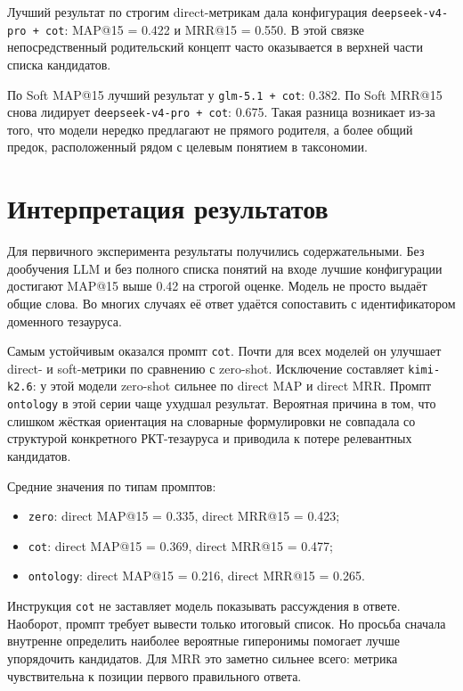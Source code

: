 \documentclass[12pt,a4paper,oneside,openany]{report}
\begin{document}
Лучший результат по строгим direct-метрикам дала конфигурация \texttt{deepseek-v4-pro + cot}: MAP@15 = 0.422 и MRR@15 = 0.550. В этой связке непосредственный родительский концепт часто оказывается в верхней части списка кандидатов.

По Soft MAP@15 лучший результат у \texttt{glm-5.1 + cot}: 0.382. По Soft MRR@15 снова лидирует \texttt{deepseek-v4-pro + cot}: 0.675. Такая разница возникает из-за того, что модели нередко предлагают не прямого родителя, а более общий предок, расположенный рядом с целевым понятием в таксономии.

\section{Интерпретация результатов}

Для первичного эксперимента результаты получились содержательными. Без дообучения LLM и без полного списка понятий на входе лучшие конфигурации достигают MAP@15 выше 0.42 на строгой оценке. Модель не просто выдаёт общие слова. Во многих случаях её ответ удаётся сопоставить с идентификатором доменного тезауруса.

Самым устойчивым оказался промпт \texttt{cot}. Почти для всех моделей он улучшает direct- и soft-метрики по сравнению с zero-shot. Исключение составляет \texttt{kimi-k2.6}: у этой модели zero-shot сильнее по direct MAP и direct MRR. Промпт \texttt{ontology} в этой серии чаще ухудшал результат. Вероятная причина в том, что слишком жёсткая ориентация на словарные формулировки не совпадала со структурой конкретного РКТ-тезауруса и приводила к потере релевантных кандидатов.

Средние значения по типам промптов:
\begin{itemize}
  \item \texttt{zero}: direct MAP@15 = 0.335, direct MRR@15 = 0.423;
  \item \texttt{cot}: direct MAP@15 = 0.369, direct MRR@15 = 0.477;
  \item \texttt{ontology}: direct MAP@15 = 0.216, direct MRR@15 = 0.265.
\end{itemize}

Инструкция \texttt{cot} не заставляет модель показывать рассуждения в ответе. Наоборот, промпт требует вывести только итоговый список. Но просьба сначала внутренне определить наиболее вероятные гиперонимы помогает лучше упорядочить кандидатов. Для MRR это заметно сильнее всего: метрика чувствительна к позиции первого правильного ответа.
\end{document}
